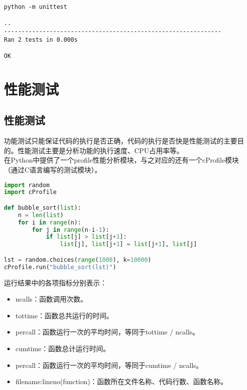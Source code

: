 \begin{tcolorbox}
	\begin{verbatim}
python -m unittest

..
--------------------------------------------------------------
Ran 2 tests in 0.000s

OK
\end{verbatim}
\end{tcolorbox}

\newpage

\section{性能测试}

\subsection{性能测试}

功能测试只能保证代码的执行是否正确，代码的执行是否快是性能测试的主要目的。性能测试主要是分析功能的执行速度、CPU占用率等。\\

在Python中提供了一个profile性能分析模块，与之对应的还有一个cProfile模块（通过C语言编写的测试模块）。\\


\begin{lstlisting}[language=Python]
import random
import cProfile

def bubble_sort(list):
    n = len(list)
    for i in range(n):
        for j in range(n-i-1):
            if list[j] > list[j+1]:
                list[j], list[j+1] = list[j+1], list[j]

lst = random.choices(range(1000), k=10000)
cProfile.run("bubble_sort(lst)")
\end{lstlisting}

运行结果中的各项指标分别表示：

\begin{itemize}
	\item ncalls：函数调用次数。

	\item tottime：函数总共运行的时间。

	\item percall：函数运行一次的平均时间，等同于tottime / ncalls。

	\item cumtime：函数总计运行时间。

	\item percall：函数运行一次的平均时间，等同于cumtime / ncalls。

	\item filename:lineno(function)：函数所在文件名称、代码行数、函数名称。
\end{itemize}

\newpage